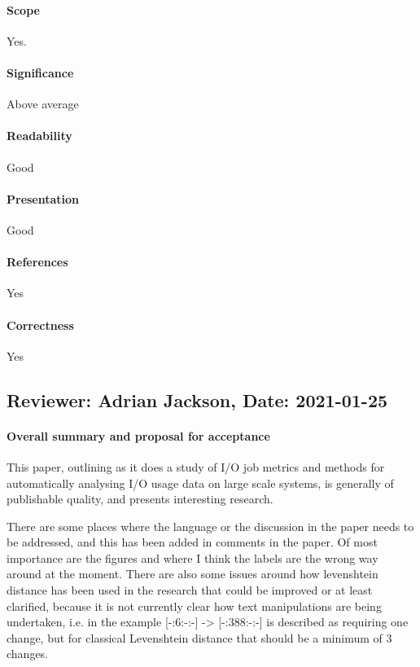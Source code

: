 \documentclass{jhps}
\begin{document}
{{{{\paragraph{Scope}   %
Yes.
\paragraph{Significance}   %
Above average
\paragraph{Readability}   %
Good
\paragraph{Presentation}
Good
\paragraph{References}   %
Yes
\paragraph{Correctness}   %
Yes

\subsection*{Reviewer: Adrian Jackson, Date: 2021-01-25}

\paragraph{Overall summary and proposal for acceptance}
This paper, outlining as it does a study of I/O job metrics and methods for automatically analysing I/O usage data on large scale systems, is generally of publishable quality, and presents interesting research. 

There are some places where the language or the discussion in the paper needs to be addressed, and this has been added in comments in the paper. Of most importance are the figures  and  where I think the labels are the wrong way around at the moment. There are also some issues around how levenshtein distance has been used in the research that could be improved or at least clarified, because it is not currently clear how text manipulations are being undertaken, i.e. in the example [-:6:-:-] -> [-:388:-:-] is described as requiring one change, but for classical Levenshtein distance that should be a minimum of 3 changes.

}}}}
\end{document}
